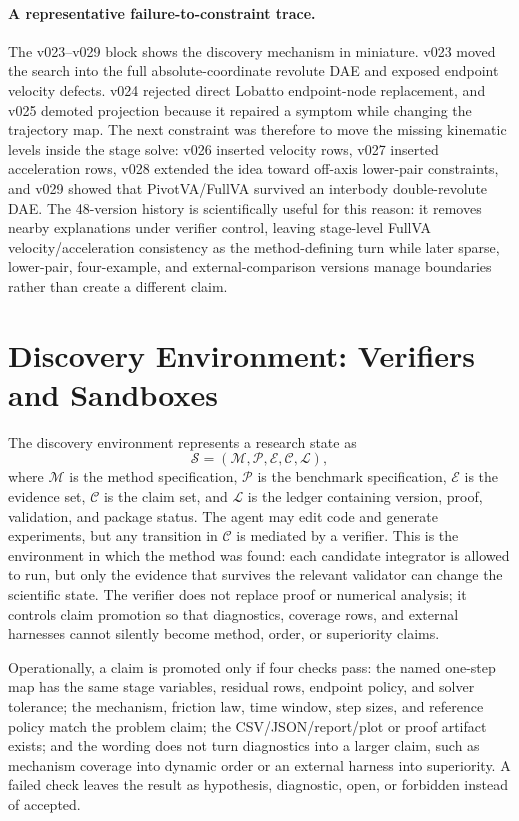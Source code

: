 \documentclass[10pt]{article}
\begin{document}
\paragraph{A representative failure-to-constraint trace.}
The v023--v029 block shows the discovery mechanism in miniature. v023 moved the
search into the full absolute-coordinate revolute DAE and exposed endpoint
velocity defects. v024 rejected direct Lobatto endpoint-node replacement, and
v025 demoted projection because it repaired a symptom while changing the
trajectory map. The next constraint was therefore to move the missing
kinematic levels inside the stage solve: v026 inserted velocity rows, v027
inserted acceleration rows, v028 extended the idea toward off-axis lower-pair
constraints, and v029 showed that PivotVA/FullVA survived an interbody
double-revolute DAE. The 48-version history is scientifically useful for this
reason: it removes nearby explanations under verifier control, leaving
stage-level FullVA velocity/acceleration consistency as the method-defining
turn while later sparse, lower-pair, four-example, and external-comparison
versions manage boundaries rather than create a different claim.

\FloatBarrier

\section{Discovery Environment: Verifiers and Sandboxes}

The discovery environment represents a research state as
\[
  \mathcal{S}=(\mathcal{M},\mathcal{P},\mathcal{E},\mathcal{C},\mathcal{L}),
\]
where $\mathcal{M}$ is the method specification, $\mathcal{P}$ is the
benchmark specification, $\mathcal{E}$ is the evidence set, $\mathcal{C}$ is
the claim set, and $\mathcal{L}$ is the ledger containing version, proof,
validation, and package status. The agent may edit code and generate
experiments, but any transition in $\mathcal{C}$ is mediated by a verifier.
This is the environment in which the method was found: each candidate
integrator is allowed to run, but only the evidence that survives the relevant
validator can change the scientific state.
The verifier does not replace proof or numerical analysis; it controls claim
promotion so that diagnostics, coverage rows, and external harnesses cannot
silently become method, order, or superiority claims.

Operationally, a claim is promoted only if four checks pass: the named
one-step map has the same stage variables, residual rows, endpoint policy, and
solver tolerance; the mechanism, friction law, time window, step sizes, and
reference policy match the problem claim; the CSV/JSON/report/plot or proof
artifact exists; and the wording does not turn diagnostics into a larger claim,
such as mechanism coverage into dynamic order or an external harness into
superiority. A failed check leaves the result as hypothesis, diagnostic, open,
or forbidden instead of accepted.
\end{document}
